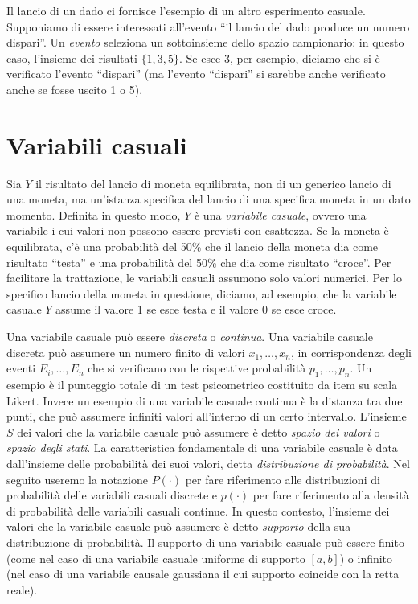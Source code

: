 \documentclass[
  11pt,
]{krantz}
\theoremstyle{definition}
\theoremstyle{definition}
\theoremstyle{definition}
\theoremstyle{definition}
\theoremstyle{remark}
\begin{document}
Il lancio di un dado ci fornisce l'esempio di un altro esperimento casuale. Supponiamo di essere interessati all'evento ``il lancio del dado produce un numero dispari''. Un \emph{evento} seleziona un sottoinsieme dello spazio campionario: in questo caso, l'insieme dei risultati \(\{1, 3, 5\}\). Se esce 3, per esempio, diciamo che si è verificato l'evento ``dispari'' (ma l'evento ``dispari'' si sarebbe anche verificato anche se fosse uscito 1 o 5).

\hypertarget{variabili-casuali}{%
\section{Variabili casuali}\label{variabili-casuali}}

Sia \(Y\) il risultato del lancio di moneta equilibrata, non di un generico lancio di una moneta, ma un'istanza specifica del lancio di una specifica moneta in un dato momento. Definita in questo modo, \(Y\) è una \emph{variabile casuale}, ovvero una variabile i cui valori non possono essere previsti con esattezza. Se la moneta è equilibrata, c'è una probabilità del 50\% che il lancio della moneta dia come risultato ``testa'' e una probabilità del 50\% che dia come risultato ``croce''. Per facilitare la trattazione, le variabili casuali assumono solo valori numerici. Per lo specifico lancio della moneta in questione, diciamo, ad esempio, che la variabile casuale \(Y\) assume il valore 1 se esce testa e il valore 0 se esce croce.

Una variabile casuale può essere \emph{discreta} o \emph{continua}. Una variabile casuale discreta può assumere un numero finito di valori \(x_1, \dots ,x_n\), in corrispondenza degli eventi \(E_i, \dots, E_n\) che si verificano con le rispettive probabilità \(p_1, \dots, p_n\). Un esempio è il punteggio totale di un test psicometrico costituito da item su scala Likert. Invece un esempio di una variabile casuale continua è la distanza tra due punti, che può assumere infiniti valori all'interno di un certo intervallo. L'insieme \(S\) dei valori che la variabile casuale può assumere è detto \emph{spazio dei valori} o \emph{spazio degli stati}. La caratteristica fondamentale di una variabile casuale è data dall'insieme delle probabilità dei suoi valori, detta \emph{distribuzione di probabilità}. Nel seguito useremo la notazione \(P(\cdot)\) per fare riferimento alle distribuzioni di probabilità delle variabili casuali discrete e \(p(\cdot)\) per fare riferimento alla densità di probabilità delle variabili casuali continue. In questo contesto, l'insieme dei valori che la variabile casuale può assumere è detto \emph{supporto} della sua distribuzione di probabilità. Il supporto di una variabile casuale può essere finito (come nel caso di una variabile casuale uniforme di supporto \([a, b]\)) o infinito (nel caso di una variabile causale gaussiana il cui supporto coincide con la retta reale).
\end{document}
